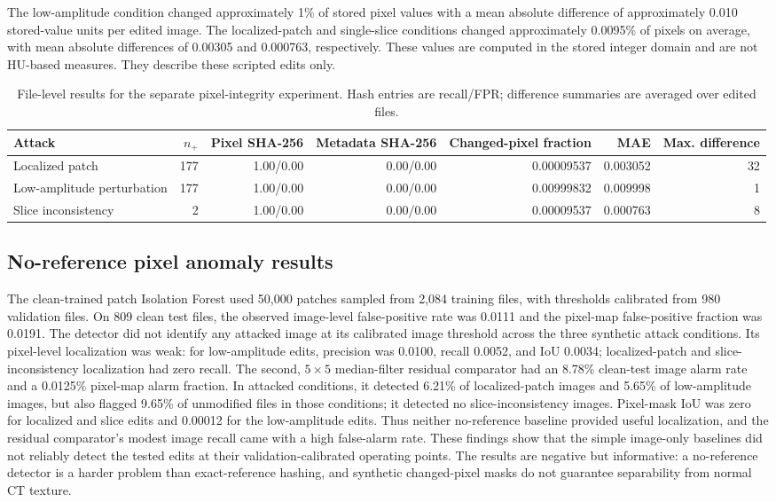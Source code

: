 \documentclass[journal]{IEEEtran}
\begin{document}
  The low-amplitude condition changed approximately 1\% of stored pixel values with a mean absolute difference of approximately 0.010 stored-value units per edited image. The localized-patch and single-slice conditions changed approximately 0.0095\% of pixels on average, with mean absolute differences of 0.00305 and 0.000763, respectively. These values are computed in the stored integer domain and are not HU-based measures. They describe these scripted edits only.
  
  \begin{table}[t]
  \caption{File-level results for the separate pixel-integrity experiment. Hash entries are recall/FPR; difference summaries are averaged over edited files.}
  \label{tab:pixelresults}
  \centering\footnotesize
  \begin{tabular}{lrrrrrr}
  \toprule
  Attack & $n_+$ & Pixel SHA-256 & Metadata SHA-256 & Changed-pixel fraction & MAE & Max. difference \\
  \midrule
  Localized patch & 177 & 1.00/0.00 & 0.00/0.00 & 0.00009537 & 0.003052 & 32 \\
  Low-amplitude perturbation & 177 & 1.00/0.00 & 0.00/0.00 & 0.00999832 & 0.009998 & 1 \\
  Slice inconsistency & 2 & 1.00/0.00 & 0.00/0.00 & 0.00009537 & 0.000763 & 8 \\
  \bottomrule
  \end{tabular}
  \end{table}
  
  \subsection{No-reference pixel anomaly results}
  The clean-trained patch Isolation Forest used 50,000 patches sampled from 2,084 training files, with thresholds calibrated from 980 validation files. On 809 clean test files, the observed image-level false-positive rate was 0.0111 and the pixel-map false-positive fraction was 0.0191. The detector did not identify any attacked image at its calibrated image threshold across the three synthetic attack conditions. Its pixel-level localization was weak: for low-amplitude edits, precision was 0.0100, recall 0.0052, and IoU 0.0034; localized-patch and slice-inconsistency localization had zero recall. The second, $5\times5$ median-filter residual comparator had an 8.78\% clean-test image alarm rate and a 0.0125\% pixel-map alarm fraction. In attacked conditions, it detected 6.21\% of localized-patch images and 5.65\% of low-amplitude images, but also flagged 9.65\% of unmodified files in those conditions; it detected no slice-inconsistency images. Pixel-mask IoU was zero for localized and slice edits and 0.00012 for the low-amplitude edits. Thus neither no-reference baseline provided useful localization, and the residual comparator's modest image recall came with a high false-alarm rate. These findings show that the simple image-only baselines did not reliably detect the tested edits at their validation-calibrated operating points. The results are negative but informative: a no-reference detector is a harder problem than exact-reference hashing, and synthetic changed-pixel masks do not guarantee separability from normal CT texture.
  
\end{document}
